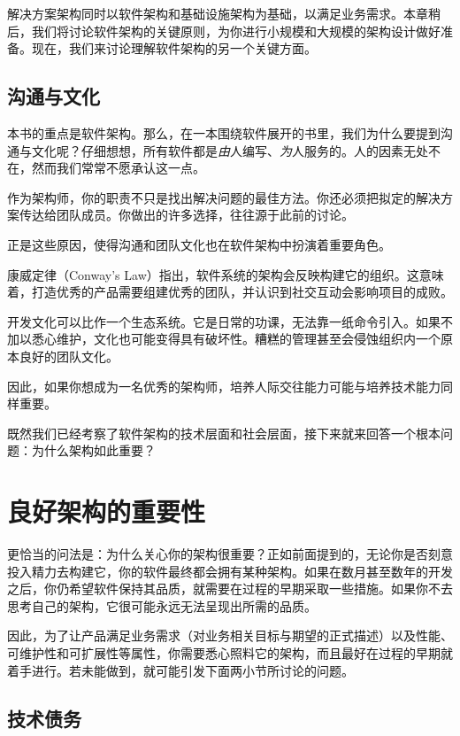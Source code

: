 \label{idx:005}
解决方案架构同时以软件架构和基础设施架构为基础，以满足业务需求。本章稍后，我们将讨论软件架构的关键原则，为你进行小规模和大规模的架构设计做好准备。现在，我们来讨论理解软件架构的另一个关键方面。

\subsection{沟通与文化}

\label{idx:006}
本书的重点是软件架构。那么，在一本围绕软件展开的书里，我们为什么要提到沟通与文化呢？仔细想想，所有软件都是\emph{由}人编写、\emph{为}人服务的。人的因素无处不在，然而我们常常不愿承认这一点。

作为架构师，你的职责不只是找出解决问题的最佳方法。你还必须把拟定的解决方案传达给团队成员。你做出的许多选择，往往源于此前的讨论。

正是这些原因，使得沟通和团队文化也在软件架构中扮演着重要角色。

康威定律（Conway's Law）指出，软件系统的架构会反映构建它的组织。这意味着，打造优秀的产品需要组建优秀的团队，并认识到社交互动会影响项目的成败。

开发文化可以比作一个生态系统。它是日常的功课，无法靠一纸命令引入。如果不加以悉心维护，文化也可能变得具有破坏性。糟糕的管理甚至会侵蚀组织内一个原本良好的团队文化。

因此，如果你想成为一名优秀的架构师，培养人际交往能力可能与培养技术能力同样重要。

既然我们已经考察了软件架构的技术层面和社会层面，接下来就来回答一个根本问题：为什么架构如此重要？

\section{良好架构的重要性}

\label{idx:007}
更恰当的问法是：为什么关心你的架构很重要？正如前面提到的，无论你是否刻意投入精力去构建它，你的软件最终都会拥有某种架构。如果在数月甚至数年的开发之后，你仍希望软件保持其品质，就需要在过程的早期采取一些措施。如果你不去思考自己的架构，它很可能永远无法呈现出所需的品质。

因此，为了让产品满足业务需求（对业务相关目标与期望的正式描述）以及性能、可维护性和可扩展性等属性，你需要悉心照料它的架构，而且最好在过程的早期就着手进行。若未能做到，就可能引发下面两小节所讨论的问题。

\subsection{技术债务}

